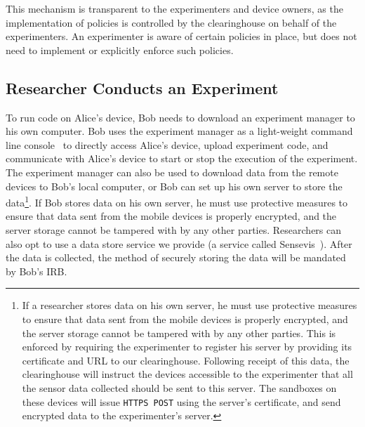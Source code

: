 This mechanism is transparent to the experimenters 
and device owners, as the implementation of policies is controlled by the 
clearinghouse on behalf of the experimenters. An experimenter is aware 
of certain policies in place, but does not need to implement or explicitly
enforce such policies. 


\subsection{Researcher Conducts an Experiment}\label{sec-emt}

To run code on Alice's device, Bob needs to download an experiment 
manager to his own computer.
Bob uses the experiment manager as a light-weight command line 
console~\cite{demo-kit} to directly access Alice's device, upload 
experiment code, and %
communicate with Alice's device to start or stop the execution of the experiment. 
The experiment manager can also be used to download data 
from the remote devices to Bob's local computer, or
Bob can set up his own server to store the data\footnote{\scriptsize
If a researcher stores data on his own server, he must use protective
measures to ensure that data sent from the mobile devices is
properly encrypted, and the server storage cannot be tampered
with by any other parties. This is enforced by requiring the experimenter to register
his server by providing its certificate and URL to our
clearinghouse. Following receipt of this data, the clearinghouse will instruct the devices
accessible to the experimenter that all the sensor data collected should be
sent to this server. The sandboxes on these devices will issue
\texttt{HTTPS POST} using the server's certificate, and send encrypted
data to the experimenter's server.}. 
If Bob stores data on his own server, he must use protective
measures to ensure that data sent from the mobile devices is
properly encrypted, and the server storage cannot be tampered
with by any other parties. Researchers can also opt to use a data 
store service we provide (a service called Sensevis~\cite{sensevis}). 
After the data is collected, the method of 
securely storing the data will be mandated by Bob's IRB.

